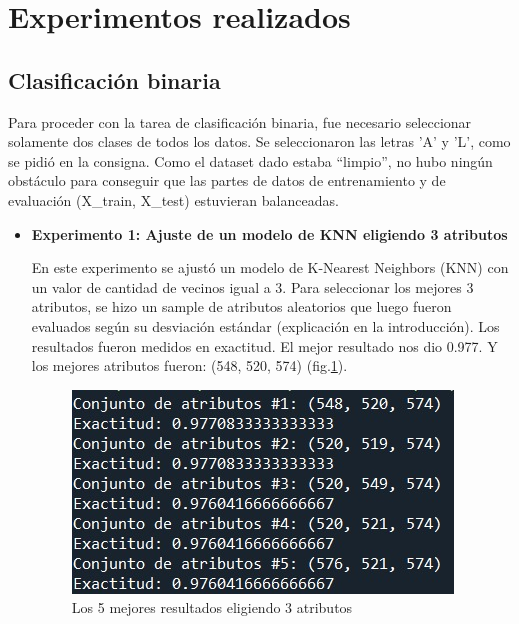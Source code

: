 \documentclass[11pt,a4paper, twocolumn]{article}
\begin{document}
\section{Experimentos realizados}
\subsection{Clasificación binaria}
Para proceder con la tarea de clasificación binaria, fue necesario seleccionar solamente dos clases de todos los datos. Se seleccionaron las letras 'A' y 'L', como se pidió en la consigna.
Como el dataset dado estaba ``limpio'', no hubo ningún obstáculo para conseguir que las partes de datos de entrenamiento y de evaluación (X\_train, X\_test) estuvieran balanceadas.

\begin{itemize}
    \item[]
       \textbf{Experimento 1: Ajuste de un modelo de KNN eligiendo 3 atributos}

En este experimento se ajustó un modelo de K-Nearest Neighbors (KNN) con un valor de cantidad de vecinos igual a 3. 
Para seleccionar los mejores 3 atributos, se hizo un sample de atributos aleatorios que luego fueron evaluados según su desviación estándar (explicación en la introducción). 
Los resultados fueron medidos en exactitud. El mejor resultado nos dio 0.977. Y los mejores atributos fueron: (548, 520, 574) (fig.\ref{fig:7}).

\begin{figure}[H]
	\centering
	\includegraphics[scale=0.8]{figuras/2a_1.jpg}
	\caption{Los 5 mejores resultados eligiendo 3  atributos}
	\label{fig:7}
\end{figure}
\end{itemize}
\end{document}
